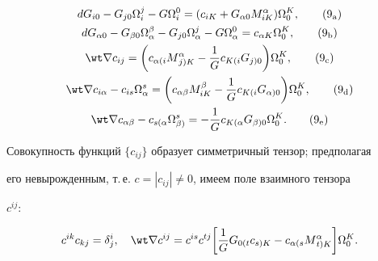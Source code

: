 \begin{gather} 


dG_{i0}-G_{j0}\Omega^j_i-G\Omega^0_i=(c_{iK}+G_{\alpha0} 


M^\alpha_{iK})\Omega^K_0, \tag{9${}_{\mathrm a}$} \\ 


% 


dG_{\alpha0}-G_{\beta0}\Omega^\beta_\alpha-G_{j0} 


\Omega^j_\alpha-G\Omega^0_\alpha= 


c_{\alpha K}\Omega^K_0, \tag{9${}_{\mathrm b}$} \\ 


% 


\wt\nabla c_{ij}=\bigg(c{}_{\alpha(i}M{}^\alpha_{j)K} 


-\frac{1}{G}c{}_{K(i}G{}_{j)0} \bigg)\Omega^K_0,\tag{9${}_{\mathrm c}$}\\ 


% 


\wt\nabla c_{i\alpha}-c_{is}\Omega^s_\alpha=\bigg(c_{\alpha\beta} 


M^\beta_{iK}-\frac{1}{G}c{}_{K(i}G{}_{\alpha)0} \bigg) 


\Omega^K_0, \tag{9${}_{\mathrm d}$} \\ 


\wt\nabla c_{\alpha\beta}-c{}_{s(\alpha}\Omega{}^s_{\beta)}= 


-\frac{1}{G}c{}_{K(\alpha}G{}_{\beta)0}\Omega^K_0. 


\tag{9${}_{\mathrm e}$} 


\end{gather} 


\addtocounter{equation}{1}





\noindent{}Совокупность функций $\{c_{ij}\}$ образует симметричный тензор; предполагая 


его невырожденным, т.\,е. $c=|c_{ij}|\ne0$, имеем поле взаимного тензора 


$c^{ij}$: 


\begin{equation} 


c^{ik}c_{kj}=\delta^i_j,\quad \wt\nabla c^{ij}= 


c^{is}c^{tj}\bigg[\frac{1}{G}G{}_{0(t}c{}_{s)K}- 


c{}_{\alpha(s}M{}^\alpha_{t)K}\bigg]\Omega^K_0. 


\end{equation} 



